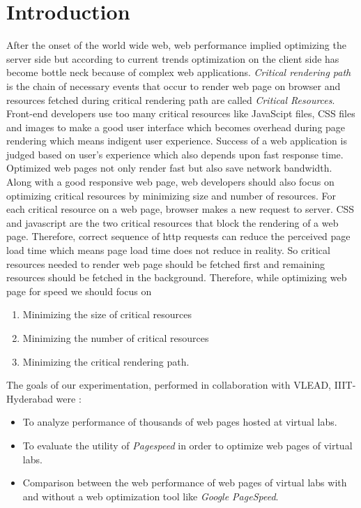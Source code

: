 \documentclass[conference]{IEEEtran}
\begin{document}
\section{Introduction}\label{sec-2}
After the onset of the world wide web, web performance implied optimizing the
server side but according to current trends
optimization on the client side has become bottle neck because of complex web
applications. 
{\it Critical rendering path} is the chain of necessary events that
occur to render web page on browser and resources fetched during critical rendering path are called 
{\it Critical Resources}\cite{crp}. Front-end developers use too many critical resources like
JavaScipt files, CSS files and images to make a good user interface which becomes
overhead during page rendering which means indigent user experience. Success of a web
application is judged based on user's experience which also depends upon fast response
time. Optimized web pages not only render fast but also save network
bandwidth. Along with a good responsive web page, web developers should
also focus on optimizing critical resources by minimizing size and number of resources.
For each critical resource on a web page, browser makes a new request to server.
CSS and javascript are the two critical resources that block the rendering of a web page.
Therefore, correct sequence of http requests can reduce the perceived page load time which means page
load time does not reduce in reality. So critical resources needed to render web page should be
fetched first and remaining resources should be fetched in the background. Therefore,
while optimizing web page for speed we should focus on \cite{crpo}
\begin{enumerate}
 \item Minimizing the size of critical resources
 \item Minimizing the number of critical resources
 \item Minimizing the critical rendering path.
\end{enumerate}

The goals of our experimentation, performed in collaboration with VLEAD,
IIIT-Hyderabad were :

\begin{itemize}
\item To analyze performance of thousands of web pages hosted at virtual labs.
\item To evaluate the utility of {\it Pagespeed} in order to optimize web pages of virtual labs.
\item Comparison between the web performance of web pages of virtual labs with
and without a web optimization tool like {\it Google PageSpeed}.
\end{itemize}
\end{document}
